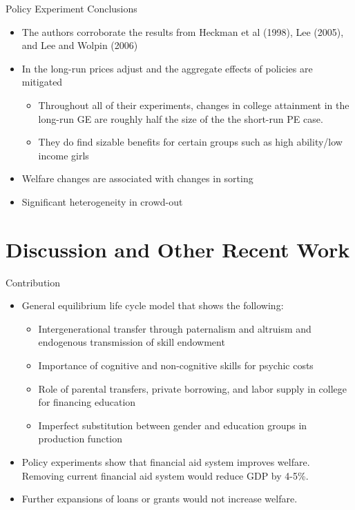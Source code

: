 \documentclass{beamer}
\begin{document}
\begin{frame}{Policy Experiment Conclusions}

\begin{itemize}
\item The authors corroborate the results from Heckman et al (1998), Lee (2005), and Lee and Wolpin (2006) 
\item In the long-run prices adjust and the aggregate effects of policies are mitigated
\begin{itemize}
\item Throughout all of their experiments, changes in college attainment in the long-run GE are roughly half the size of the the short-run PE case.
\item They do find sizable benefits for certain groups such as high ability/low income girls
\end{itemize}
\item Welfare changes are associated with changes in sorting
\item Significant heterogeneity in crowd-out
\end{itemize}
\end{frame}

\section{Discussion and Other Recent Work}
\begin{frame}{Contribution}
\begin{itemize}
\item General equilibrium life cycle model that shows the following: 
\begin{itemize}
\item Intergenerational transfer through paternalism and altruism and endogenous transmission of skill endowment
\item Importance of cognitive and non-cognitive skills for psychic costs 
\item Role of parental transfers, private borrowing, and labor supply in college for financing education
\item Imperfect substitution between gender and education groups in production function
\end{itemize}
\item Policy experiments show that financial aid system improves welfare. Removing current financial aid system would reduce GDP by 4-5\%.
\item Further expansions of loans or grants would not increase welfare.
\end{itemize}
\end{frame}
\end{document}
